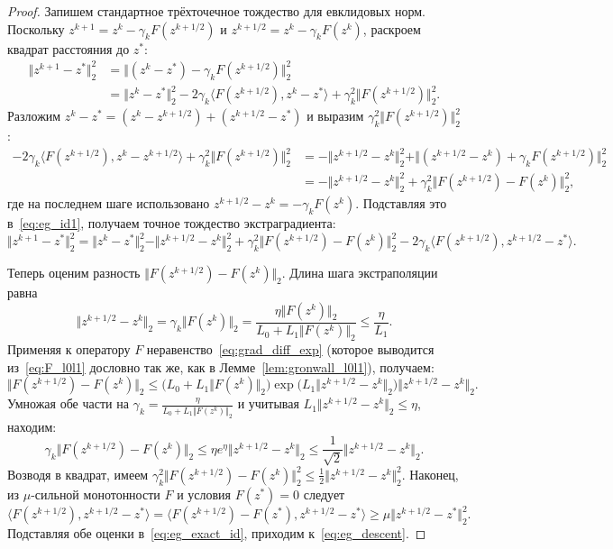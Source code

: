 \documentclass[11pt, a4paper]{article}
\theoremstyle{definition}
\begin{document}
\begin{proof}
Запишем стандартное трёхточечное тождество для евклидовых норм. Поскольку $z^{k+1} = z^k - \gamma_k F(z^{k+1/2})$ и $z^{k+1/2} = z^k - \gamma_k F(z^k)$, раскроем квадрат расстояния до $z^*$:
\begin{align}
\Vert z^{k+1} - z^* \Vert_2^2 &= \Vert (z^k - z^*) - \gamma_k F(z^{k+1/2}) \Vert_2^2 \nonumber \\
&= \Vert z^k - z^* \Vert_2^2 - 2\gamma_k \langle F(z^{k+1/2}), z^k - z^* \rangle + \gamma_k^2 \Vert F(z^{k+1/2}) \Vert_2^2. \label{eq:eg_id1}
\end{align}
Разложим $z^k - z^* = (z^k - z^{k+1/2}) + (z^{k+1/2} - z^*)$ и выразим $\gamma_k^2 \Vert F(z^{k+1/2}) \Vert_2^2$:
\begin{align*}
-2\gamma_k \langle F(z^{k+1/2}), z^k - z^{k+1/2} \rangle + \gamma_k^2 \Vert F(z^{k+1/2}) \Vert_2^2 &= -\Vert z^{k+1/2} - z^k \Vert_2^2 + \Vert (z^{k+1/2} - z^k) + \gamma_k F(z^{k+1/2}) \Vert_2^2 \\
&= -\Vert z^{k+1/2} - z^k \Vert_2^2 + \gamma_k^2 \Vert F(z^{k+1/2}) - F(z^k) \Vert_2^2,
\end{align*}
где на последнем шаге использовано $z^{k+1/2} - z^k = -\gamma_k F(z^k)$. Подставляя это в~\eqref{eq:eg_id1}, получаем точное тождество экстраградиента:
\begin{equation}\label{eq:eg_exact_id}
\Vert z^{k+1} - z^* \Vert_2^2 = \Vert z^k - z^* \Vert_2^2 - \Vert z^{k+1/2} - z^k \Vert_2^2 + \gamma_k^2 \Vert F(z^{k+1/2}) - F(z^k) \Vert_2^2 - 2\gamma_k \langle F(z^{k+1/2}), z^{k+1/2} - z^* \rangle.
\end{equation}

Теперь оценим разность $\Vert F(z^{k+1/2}) - F(z^k) \Vert_2$. Длина шага экстраполяции равна
\[
\Vert z^{k+1/2} - z^k \Vert_2 = \gamma_k \Vert F(z^k) \Vert_2 = \frac{\eta \Vert F(z^k) \Vert_2}{L_0 + L_1 \Vert F(z^k) \Vert_2} \le \frac{\eta}{L_1}.
\]
Применяя к оператору $F$ неравенство~\eqref{eq:grad_diff_exp} (которое выводится из~\eqref{eq:F_l0l1} дословно так же, как в Лемме~\ref{lem:gronwall_l0l1}), получаем:
\[
\Vert F(z^{k+1/2}) - F(z^k) \Vert_2 \le \big(L_0 + L_1 \Vert F(z^k) \Vert_2\big) \exp\big(L_1 \Vert z^{k+1/2} - z^k \Vert_2\big) \Vert z^{k+1/2} - z^k \Vert_2.
\]
Умножая обе части на $\gamma_k = \frac{\eta}{L_0 + L_1 \Vert F(z^k) \Vert_2}$ и учитывая $L_1 \Vert z^{k+1/2} - z^k \Vert_2 \le \eta$, находим:
\[
\gamma_k \Vert F(z^{k+1/2}) - F(z^k) \Vert_2 \le \eta e^\eta \Vert z^{k+1/2} - z^k \Vert_2 \le \frac{1}{\sqrt{2}} \Vert z^{k+1/2} - z^k \Vert_2.
\]
Возводя в квадрат, имеем $\gamma_k^2 \Vert F(z^{k+1/2}) - F(z^k) \Vert_2^2 \le \frac{1}{2} \Vert z^{k+1/2} - z^k \Vert_2^2$. Наконец, из $\mu$-сильной монотонности $F$ и условия $F(z^*) = 0$ следует
\[
\langle F(z^{k+1/2}), z^{k+1/2} - z^* \rangle = \langle F(z^{k+1/2}) - F(z^*), z^{k+1/2} - z^* \rangle \ge \mu \Vert z^{k+1/2} - z^* \Vert_2^2.
\]
Подставляя обе оценки в~\eqref{eq:eg_exact_id}, приходим к~\eqref{eq:eg_descent}.
\end{proof}
\end{document}
